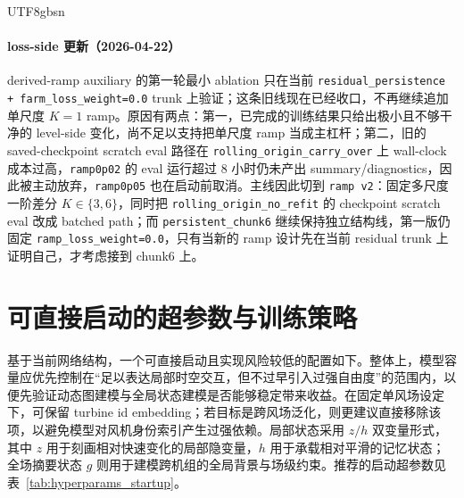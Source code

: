 \documentclass[11pt]{article}
\newif\ifneedsectionclearpage
\let\oldsection\section
\renewcommand{\section}{%
  \ifneedsectionclearpage
    \clearpage
  \else
    \global\needsectionclearpagetrue
  \fi
  \oldsection
}
\begin{document}
\begin{CJK}{UTF8}{gbsn}
\paragraph{loss-side 更新（2026-04-22）}
derived-ramp auxiliary 的第一轮最小 ablation 只在当前 \texttt{residual\_persistence + farm\_loss\_weight=0.0} trunk 上验证；这条旧线现在已经收口，不再继续追加单尺度 \(K=1\) ramp。原因有两点：第一，已完成的训练结果只给出极小且不够干净的 level-side 变化，尚不足以支持把单尺度 ramp 当成主杠杆；第二，旧的 saved-checkpoint scratch eval 路径在 \texttt{rolling\_origin\_carry\_over} 上 wall-clock 成本过高，\texttt{ramp0p02} 的 eval 运行超过 8 小时仍未产出 summary/diagnostics，因此被主动放弃，\texttt{ramp0p05} 也在启动前取消。主线因此切到 \texttt{ramp v2}：固定多尺度一阶差分 \(K\in\{3,6\}\)，同时把 \texttt{rolling\_origin\_no\_refit} 的 checkpoint scratch eval 改成 batched path；而 \texttt{persistent\_chunk6} 继续保持独立结构线，第一版仍固定 \texttt{ramp\_loss\_weight=0.0}，只有当新的 ramp 设计先在当前 residual trunk 上证明自己，才考虑接到 chunk6 上。

\section{可直接启动的超参数与训练策略}

基于当前网络结构，一个可直接启动且实现风险较低的配置如下。整体上，模型容量应优先控制在“足以表达局部时空交互，但不过早引入过强自由度”的范围内，以便先验证动态图建模与全局状态建模是否能够稳定带来收益。在固定单风场设定下，可保留 turbine id embedding；若目标是跨风场泛化，则更建议直接移除该项，以避免模型对风机身份索引产生过强依赖。局部状态采用 \(z/h\) 双变量形式，其中 \(z\) 用于刻画相对快速变化的局部隐变量，\(h\) 用于承载相对平滑的记忆状态；全场摘要状态 \(g\) 则用于建模跨机组的全局背景与场级约束。推荐的启动超参数见表~\ref{tab:hyperparams_startup}。


\end{CJK}
\end{document}
